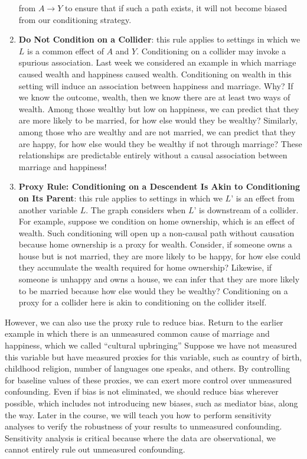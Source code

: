 \documentclass[
  single column]{article}
\begin{document}
\begin{enumerate}
  from \(A \to Y\) to ensure that if such a path exists, it will not
  become biased from our conditioning strategy.
\item
  \textbf{Do Not Condition on a Collider}: this rule applies to settings
  in which we \(L\) is a common effect of \(A\) and \(Y\). Conditioning
  on a collider may invoke a spurious association. Last week we
  considered an example in which marriage caused wealth and happiness
  caused wealth. Conditioning on wealth in this setting will induce an
  association between happiness and marriage. Why? If we know the
  outcome, wealth, then we know there are at least two ways of wealth.
  Among those wealthy but low on happiness, we can predict that they are
  more likely to be married, for how else would they be wealthy?
  Similarly, among those who are wealthy and are not married, we can
  predict that they are happy, for how else would they be wealthy if not
  through marriage? These relationships are predictable entirely without
  a causal association between marriage and happiness!
\item
  \textbf{Proxy Rule: Conditioning on a Descendent Is Akin to
  Conditioning on Its Parent}: this rule applies to settings in which we
  \(L’\) is an effect from another variable \(L\). The graph considers
  when \(L’\) is downstream of a collider. For example, suppose we
  condition on home ownership, which is an effect of wealth. Such
  conditioning will open up a non-causal path without causation because
  home ownership is a proxy for wealth. Consider, if someone owns a
  house but is not married, they are more likely to be happy, for how
  else could they accumulate the wealth required for home ownership?
  Likewise, if someone is unhappy and owns a house, we can infer that
  they are more likely to be married because how else would they be
  wealthy? Conditioning on a proxy for a collider here is akin to
  conditioning on the collider itself.
\end{enumerate}

However, we can also use the proxy rule to reduce bias. Return to the
earlier example in which there is an unmeasured common cause of marriage
and happiness, which we called ``cultural upbringing'' Suppose we have
not measured this variable but have measured proxies for this variable,
such as country of birth, childhood religion, number of languages one
speaks, and others. By controlling for baseline values of these proxies,
we can exert more control over unmeasured confounding. Even if bias is
not eliminated, we should reduce bias wherever possible, which includes
not introducing new biases, such as mediator bias, along the way. Later
in the course, we will teach you how to perform sensitivity analyses to
verify the robustness of your results to unmeasured confounding.
Sensitivity analysis is critical because where the data are
observational, we cannot entirely rule out unmeasured confounding.
\end{document}
